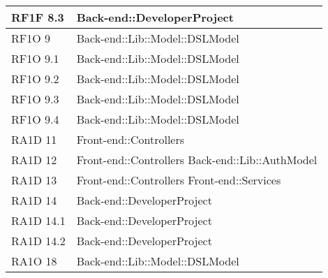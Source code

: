 \begin{center}
\begin{longtable}{|p{3cm}|p{7cm}|}
      RF1F 8.3 & Back-end::DeveloperProject \\ \hline
      RF1O 9 & Back-end::Lib::Model::DSLModel \\ \hline
      RF1O 9.1 & Back-end::Lib::Model::DSLModel \\ \hline
      RF1O 9.2 & Back-end::Lib::Model::DSLModel \\ \hline
      RF1O 9.3 & Back-end::Lib::Model::DSLModel \\ \hline
      RF1O 9.4 & Back-end::Lib::Model::DSLModel \\ \hline
      RA1D 11 & Front-end::Controllers \\ \hline
      RA1D 12 & Front-end::Controllers \newline     
      			Back-end::Lib::AuthModel \\ \hline
      RA1D 13 & Front-end::Controllers \newline
      			Front-end::Services \\ \hline
      RA1D 14 &	Back-end::DeveloperProject \\ \hline
      RA1D 14.1 & Back-end::DeveloperProject \\ \hline
      RA1D 14.2 & Back-end::DeveloperProject \\ \hline
      RA1O 18 & Back-end::Lib::Model::DSLModel \\ \hline
		      
       \end{longtable}
      \egroup
      \end{center}  
\clearpage